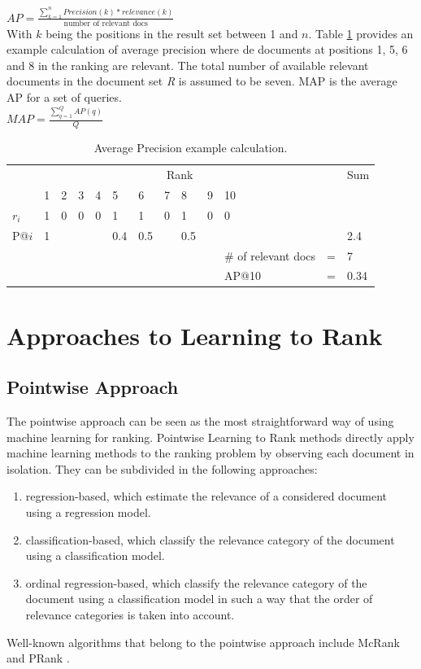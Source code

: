 $AP = \frac{\sum\nolimits_{k=1}^{n}Precision(k)*relevance(k)}{\text{number of relevant docs}}$\\

With $k$ being the positions in the result set between 1 and $n$. Table \ref{tab:example_calculation_AP} provides an example calculation of average precision where de documents at positions 1, 5, 6 and 8 in the ranking are relevant. The total number of available relevant documents in the document set \emph{R} is assumed to be seven.
\ac{MAP} is the average \ac{AP} for a set of queries.\\

$MAP = \frac{\sum\nolimits_{q=1}^{Q}AP(q)}{Q}$\\

\begin{table}
\begin{tabular}{lllllllllllll}
 & \multicolumn{10}{c}{Rank} &  & Sum \\ 
\cline{2-11}
 & 1 & 2 & 3 & 4 & 5 & 6 & 7 & 8 & 9 & 10 &  &  \\ 
\hline
$r_i$ & 1 & 0 & 0 & 0 & 1 & 1 & 0 & 1 & 0 & 0 &  &  \\ 
P@$i$ & 1 &  &  &  & 0.4 & 0.5 &  & 0.5 &  &  &  & 2.4 \\ 
\hline
 &  &  &  &  &  &  &  &  &  & \# of relevant docs & = & 7 \\ 
 &  &  &  &  &  &  &  &  &  & AP@10 & = & 0.34 \\ 
\end{tabular}
\caption{Average Precision example calculation.}
\label{tab:example_calculation_AP}
\end{table}

\section{Approaches to Learning to Rank}
\label{sec:ltr_approaches}
\subsection{Pointwise Approach}
The pointwise approach can be seen as the most straightforward way of using machine learning for ranking. Pointwise Learning to Rank methods directly apply machine learning methods to the ranking problem by observing each document in isolation. They can be subdivided in the following approaches:
	\begin{enumerate}
	\item regression-based, which estimate the relevance of a considered document using a regression model.
	\item classification-based, which classify the relevance category of the document using a classification model.
	\item ordinal regression-based, which classify the relevance category of the document using a classification model in such a way that the order of relevance categories is taken into account. 
	\end{enumerate}
Well-known algorithms that belong to the pointwise approach include McRank \cite{Li2007} and PRank \cite{Crammer2001}.
